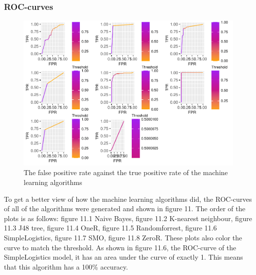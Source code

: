 \documentclass[
]{article}
\begin{document}
\newpage

\hypertarget{roc-curves}{%
\subsubsection{ROC-curves}\label{roc-curves}}

\begin{figure}[H]

{\centering \includegraphics{CrabProject_files/figure-latex/rocs of algorithms-1} 

}

\caption{The false positive rate against the true positive rate of the machine learning algorithms}\label{fig:rocs of algorithms}
\end{figure}

To get a better view of how the machine learning algorithms did, the
ROC-curves of all of the algorithms were generated and shown in figure
11. The order of the plots is as follows: figure 11.1 Naive Bayes,
figure 11.2 K-nearest neighbour, figure 11.3 J48 tree, figure 11.4 OneR,
figure 11.5 Randomforrest, figure 11.6 SimpleLogistics, figure 11.7 SMO,
figure 11.8 ZeroR. These plots also color the curve to match the
threshold. As shown in figure 11.6, the ROC-curve of the SimpleLogistics
model, it has an area under the curve of exactly 1. This means that this
algorithm has a 100\% accuracy.
\end{document}
